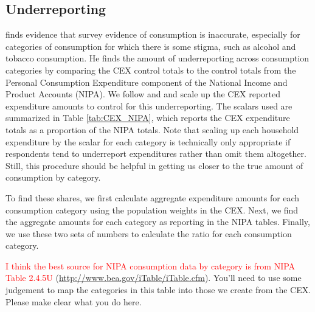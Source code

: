 \documentclass[article,11pt,letterpaper,fleqn]{article}
\theoremstyle{definition}
\numberwithin{equation}{section}
\newcommand{\cn}{\citeasnoun} %
\begin{document}
\subsection{Underreporting}

\cn{Gieseman1987} finds evidence that survey evidence of consumption is inaccurate, especially for categories of consumption for which there is some stigma, such as alcohol and tobacco consumption.  He finds the amount of underreporting across consumption categories by comparing the CEX control totals to the control totals from the Personal Consumption Expenditure component of the National Income and Product Accounts (NIPA).  We follow \cn{King1979} and \cn{FR1993} and scale up the CEX reported expenditure amounts to control for this underreporting.  The scalars used are summarized in Table \ref{tab:CEX_NIPA}, which reports the CEX expenditure totals as a proportion of the NIPA totals.  Note that scaling up each household expenditure by the scalar for each category is technically only appropriate if respondents tend to underreport expenditures rather than omit them altogether.  Still, this procedure should be helpful in getting us closer to the true amount of consumption by category.

To find these shares, we first calculate aggregate expenditure amounts for each consumption category using the population weights in the CEX.  Next, we find the aggregate amounts for each category as reporting in the NIPA tables.  Finally, we use these two sets of numbers to calculate the ratio for each consumption category.

\textcolor{red}{I think the best source for NIPA consumption data by category is from NIPA Table 2.4.5U} (\href{http://www.bea.gov/iTable/iTable.cfm}{http://www.bea.gov/iTable/iTable.cfm}).  You'll need to use some judgement to map the categories in this table into those we create from the CEX.  Please make clear what you do here.
\end{document}
